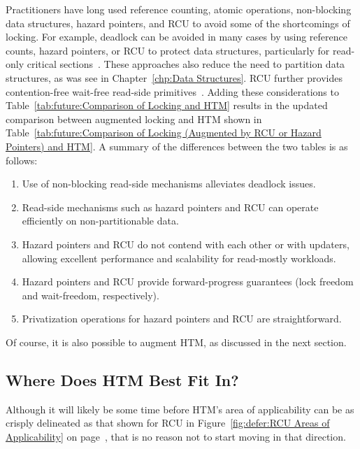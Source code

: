 

Practitioners have long used reference counting, atomic operations,
non-blocking data structures, hazard pointers, and RCU to avoid some
of the shortcomings of locking.
For example, deadlock can be avoided in many cases by using reference
counts, hazard pointers, or RCU to protect data structures,
particularly for read-only critical
sections~\cite{MagedMichael04a,HerlihyLM02,MathieuDesnoyers2012URCU,DinakarGuniguntala2008IBMSysJ,ThomasEHart2007a}.
These approaches also reduce the need to partition data
structures, as was see in Chapter~\ref{chp:Data Structures}.
RCU further provides contention-free wait-free read-side
primitives~\cite{MathieuDesnoyers2012URCU}.
Adding these considerations to
Table~\ref{tab:future:Comparison of Locking and HTM}
results in the updated comparison between augmented locking and HTM
shown in
Table~\ref{tab:future:Comparison of Locking (Augmented by RCU or Hazard Pointers) and HTM}.
A summary of the differences between the two tables is as follows:

\begin{enumerate}
\item	Use of non-blocking read-side mechanisms alleviates deadlock issues.
\item	Read-side mechanisms such as hazard pointers and RCU can operate
	efficiently on non-partitionable data.
\item	Hazard pointers and RCU do not contend with each other or with
	updaters, allowing excellent performance and scalability for
	read-mostly workloads.
\item	Hazard pointers and RCU provide forward-progress guarantees
	(lock freedom and wait-freedom, respectively).
\item	Privatization operations for hazard pointers and RCU are
	straightforward.
\end{enumerate}

Of course, it is also possible to augment HTM,
as discussed in the next section.

\subsection{Where Does HTM Best Fit In?}
\label{sec:future:Where Does HTM Best Fit In?}

Although it will likely be some time before HTM's area of applicability
can be as crisply delineated as that shown for RCU in
Figure~\ref{fig:defer:RCU Areas of Applicability} on
page~\pageref{fig:defer:RCU Areas of Applicability}, that is no reason not to
start moving in that direction.

